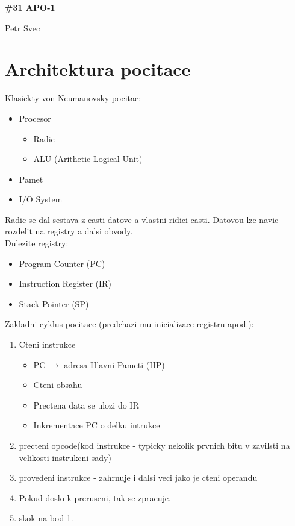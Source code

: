 \documentclass[10pt]{article}
\begin{document}
\begin{center}
\begin{LARGE}
\textbf{\#31 APO-1}\\
\end{LARGE}
Petr Svec
\end{center}

\section*{Architektura pocitace}
Klasickty von Neumanovsky pocitac:
\begin{itemize}
\item Procesor \begin{itemize}
				\item Radic
				\item ALU (Arithetic-Logical Unit)
				\end{itemize}
\item Pamet
\item I/O System
\end{itemize}
Radic se dal sestava z casti datove a vlastni ridici casti. Datovou lze navic rozdelit na registry a dalsi obvody.\\
Dulezite registry:
\begin{itemize}
\item Program Counter (PC)
\item Instruction Register (IR)
\item Stack Pointer (SP)
\end{itemize}

Zakladni cyklus pocitace (predchazi mu inicializace registru apod.):
\begin{enumerate}
\item Cteni instrukce \begin{itemize}
					\item PC $\rightarrow$ adresa Hlavni Pameti (HP)
					\item Cteni obsahu
					\item Prectena data se ulozi do IR
					\item Inkrementace PC o delku intrukce
						\end{itemize}
\item precteni opcode(kod instrukce - typicky nekolik prvnich bitu v zavilsti na velikosti instrukcni sady)
\item provedeni instrukce - zahrnuje i dalsi veci jako je cteni operandu
\item Pokud doslo k preruseni, tak se zpracuje.
\item skok na bod 1.
\end{enumerate}
\end{document}
